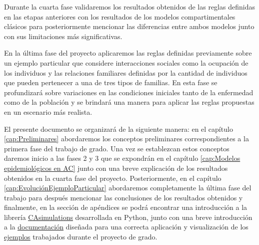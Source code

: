 Durante la cuarta fase validaremos los resultados obtenidos de las reglas definidas en las etapas anteriores con los resultados de los modelos compartimentales clásicos para posteriormente mencionar las diferencias entre ambos modelos junto con sus limitaciones más significativas.
    
En la última fase del proyecto aplicaremos las reglas definidas previamente sobre un ejemplo particular que considere interacciones sociales como la ocupación de los individuos y las relaciones familiares definidas por la cantidad de individuos que pueden pertenecer a una de tres tipos de familias. En esta fase se profundizará sobre variaciones en las condiciones iniciales tanto de la enfermedad como de la población y se brindará una manera para aplicar las reglas propuestas en un escenario más realista.

El presente documento se organizará de la siguiente manera: en el capítulo \ref{cap:Preliminares} abordaremos los conceptos preliminares correspondientes a la primera fase del trabajo de grado. Una vez se establezcan estos conceptos daremos inicio a las fases 2 y 3 que se expondrán en el capítulo \ref{cap:Modelos epidemiológicos en AC} junto con una breve explicación de los resultados obtenidos en la cuarta fase del proyecto. Posteriormente, en el capítulo \ref{cap:EvoluciónEjemploParticular} abordaremos completamente la última fase del trabajo para después mencionar las conclusiones de los resultados obtenidos y finalmente, en la sección de apéndices se podrá encontrar una introducción a la librería \href{https://github.com/Grupo-de-simulacion-con-automatas/Prediccion-del-comportamiento-de-una-enfermedad-simulada-en-AC-con-un-algoritmo-en-RN}{\underline{CAsimulations}} desarrollada en Python, junto con una breve introducción a la \href{https://github.com/Grupo-de-simulacion-con-automatas/Prediccion-del-comportamiento-de-una-enfermedad-simulada-en-AC-con-un-algoritmo-en-RN/tree/master/Codigo/CAsimulation}{\underline{documentación}} diseñada para una correcta aplicación y visualización de los \href{https://github.com/Grupo-de-simulacion-con-automatas/Prediccion-del-comportamiento-de-una-enfermedad-simulada-en-AC-con-un-algoritmo-en-RN/tree/master/Codigo}{\underline{ejemplos}} trabajados durante el proyecto de grado.
